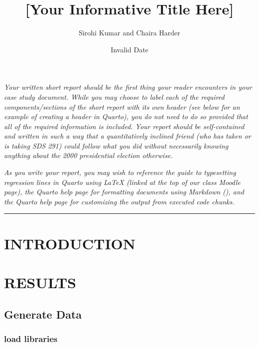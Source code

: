 \documentclass[
  letterpaper,
  DIV=11,
  numbers=noendperiod]{scrartcl}
\title{{[}Your Informative Title Here{]}}
\author{Sirohi Kumar and Chaira Harder}
\date{Invalid Date}
\begin{document}
\maketitle
\ifdefined\Shaded\renewenvironment{Shaded}{\begin{tcolorbox}[borderline west={3pt}{0pt}{shadecolor}, boxrule=0pt, interior hidden, breakable, sharp corners, frame hidden, enhanced]}{\end{tcolorbox}}\fi

\emph{Your written short report should be the first thing your reader
encounters in your case study document. While you may choose to label
each of the required components/sections of the short report with its
own header (see below for an example of creating a header in Quarto),
you do not need to do so provided that all of the required information
is included. Your report should be self-contained and written in such a
way that a quantitatively inclined friend (who has taken or is taking
SDS 291) could follow what you did without necessarily knowing anything
about the 2000 presidential election otherwise.}

\emph{As you write your report, you may wish to reference the guide to
typesetting regression lines in Quarto using LaTeX (linked at the top of
our class Moodle page), the Quarto help page for formatting documents
using Markdown (), and the Quarto help page for customizing the output
from executed code chunks.}

\begin{center}\rule{0.5\linewidth}{0.5pt}\end{center}

\hypertarget{introduction}{%
\section{INTRODUCTION}\label{introduction}}

\hypertarget{results}{%
\section{RESULTS}\label{results}}

\hypertarget{generate-data}{%
\subsection{Generate Data}\label{generate-data}}

\hypertarget{load-libraries}{%
\subsubsection{load libraries}\label{load-libraries}}
\end{document}
